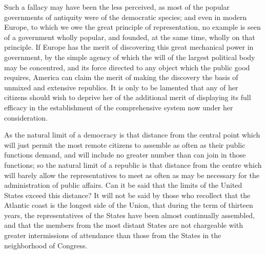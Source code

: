 Such a fallacy may have been the less perceived, as most of the popular governments of antiquity were of the democratic species; and even in modern Europe, to which we owe the great principle of representation, no example is seen of a government wholly popular, and founded, at the same time, wholly on that principle. 
If Europe has the merit of discovering this great mechanical power in government, by the simple agency of which the will of the largest political body may be concentred, and its force directed to any object which the public good requires, America can claim the merit of making the discovery the basis of unmixed and extensive republics. 
It is only to be lamented that any of her citizens should wish to deprive her of the additional merit of displaying its full efficacy in the establishment of the comprehensive system now under her consideration.

As the natural limit of a democracy is that distance from the central point which will just permit the most remote citizens to assemble as often as their public functions demand, and will include no greater number than can join in those functions; so the natural limit of a republic is that distance from the centre which will barely allow the representatives to meet as often as may be necessary for the administration of public affairs. 
Can it be said that the limits of the United States exceed this distance? 
It will not be said by those who recollect that the Atlantic coast is the longest side of the Union, that during the term of thirteen years, the representatives of the States have been almost continually assembled, and that the members from the most distant States are not chargeable with greater intermissions of attendance than those from the States in the neighborhood of Congress.

